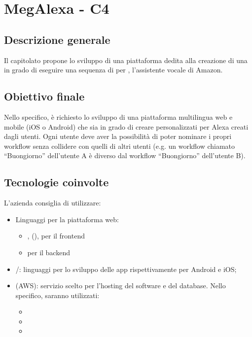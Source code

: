 \section{MegAlexa - C4} \label{c4}

    \subsection{Descrizione generale}
    Il capitolato propone lo sviluppo di una piattaforma
    dedita alla creazione di una  in grado di eseguire una sequenza
    di  per , l'assistente vocale di Amazon.

    \subsection{Obiettivo finale}
    Nello specifico, \`e richiesto lo sviluppo di una piattaforma multilingua web e
    mobile (iOS o Android) che sia in grado di
    creare  personalizzati per Alexa creati dagli utenti. Ogni utente
    deve aver la possibilit\`a di poter nominare i propri workflow senza collidere con
    quelli di altri utenti (e.g. un workflow chiamato ``Buongiorno'' dell'utente A \`e
    diverso dal workflow ``Buongiorno'' dell'utente B).

    \subsection{Tecnologie coinvolte}
    L'azienda consiglia di utilizzare:
    \begin{itemize}
    	\item Linguaggi per la piattaforma web:
    	\begin{itemize}
            \item {},  (), 
                per il frontend
            \item {} per il backend
    	\end{itemize}
        \item {}/: linguaggi per lo sviluppo delle app
            rispettivamente per Android e iOS;
        \item {} (AWS): servizio scelto per l'hosting del software e del database.
            Nello specifico, saranno utilizzati:
            \begin{itemize}
                \item {}
                \item {}
                \item {}
            \end{itemize}
    \end{itemize}

